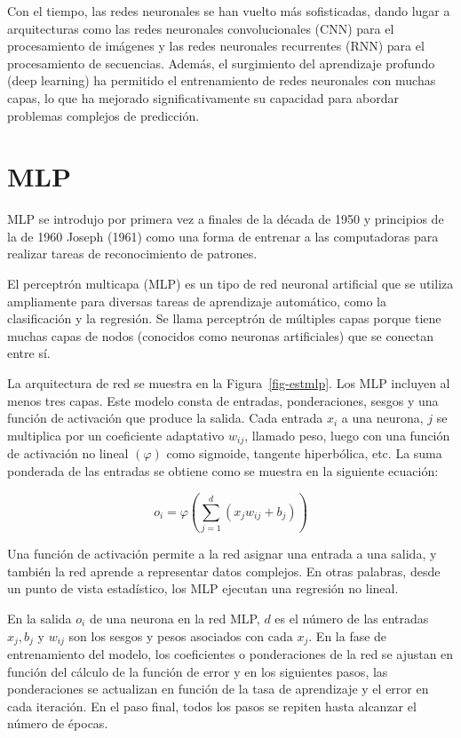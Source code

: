 \documentclass[
  letterpaper,
  DIV=11,
  numbers=noendperiod]{scrreport}
\theoremstyle{plain}
\theoremstyle{definition}
\theoremstyle{definition}
\theoremstyle{plain}
\theoremstyle{remark}
\begin{document}
Con el tiempo, las redes neuronales se han vuelto más sofisticadas,
dando lugar a arquitecturas como las redes neuronales convolucionales
(CNN) para el procesamiento de imágenes y las redes neuronales
recurrentes (RNN) para el procesamiento de secuencias. Además, el
surgimiento del aprendizaje profundo (deep learning) ha permitido el
entrenamiento de redes neuronales con muchas capas, lo que ha mejorado
significativamente su capacidad para abordar problemas complejos de
predicción.

\section*{MLP}\label{mlp}


MLP se introdujo por primera vez a finales de la década de 1950 y
principios de la de 1960 Joseph (1961) como una forma de entrenar a las
computadoras para realizar tareas de reconocimiento de patrones.

El perceptrón multicapa (MLP) es un tipo de red neuronal artificial que
se utiliza ampliamente para diversas tareas de aprendizaje automático,
como la clasificación y la regresión. Se llama perceptrón de múltiples
capas porque tiene muchas capas de nodos (conocidos como neuronas
artificiales) que se conectan entre sí.

La arquitectura de red se muestra en la Figura~\ref{fig-estmlp}. Los MLP
incluyen al menos tres capas. Este modelo consta de entradas,
ponderaciones, sesgos y una función de activación que produce la salida.
Cada entrada \(x_i\) a una neurona, \(j\) se multiplica por un
coeficiente adaptativo \(w_{ij}\), llamado peso, luego con una función
de activación no lineal \((\varphi)\) como sigmoide, tangente
hiperbólica, etc. La suma ponderada de las entradas se obtiene como se
muestra en la siguiente ecuación:

\[ o_i = \varphi\left(\sum_{j=1}^d (x_jw_{ij}+b_j)\right) \]

Una función de activación permite a la red asignar una entrada a una
salida, y también la red aprende a representar datos complejos. En otras
palabras, desde un punto de vista estadístico, los MLP ejecutan una
regresión no lineal.

En la salida \(o_i\) de una neurona en la red MLP, \(d\) es el número de
las entradas \(x_j, b_j\) y \(w_{ij}\) son los sesgos y pesos asociados
con cada \(x_j\). En la fase de entrenamiento del modelo, los
coeficientes o ponderaciones de la red se ajustan en función del cálculo
de la función de error y en los siguientes pasos, las ponderaciones se
actualizan en función de la tasa de aprendizaje y el error en cada
iteración. En el paso final, todos los pasos se repiten hasta alcanzar
el número de épocas.
\end{document}
